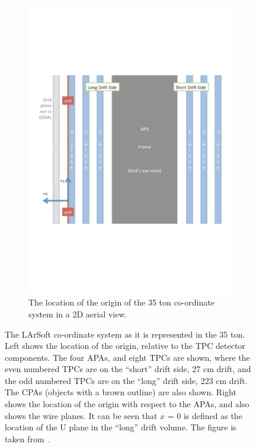 \begin{figure}
\begin{subfigure}{0.48\textwidth}
    \includegraphics[width=\textwidth]{35ton_xCenter}
    \caption{The location of the origin of the 35 ton co-ordinate system in a 2D aerial view.}
  \end{subfigure}
  \caption[The LArSoft co-ordinate system as it is represented in the 35 ton.]
          {The LArSoft co-ordinate system as it is represented in the 35 ton. Left shows the location of the origin, relative to the TPC detector components. The four APAs, and eight TPCs are shown, where the even numbered TPCs are on the ``short'' drift side, 27 cm drift, and the odd numbered TPCs are on the ``long'' drift side, 223 cm drift. The CPAs (objects with a brown outline) are also shown. Right shows the location of the origin with respect to the APAs, and also shows the wire planes. It can be seen that $x$ = 0 is defined as the location of the U plane in the ``long'' drift volume. The figure is taken from~\citep{35tonGeomPage}.}
  \label{fig:LArSoft_coords}
\end{figure}

